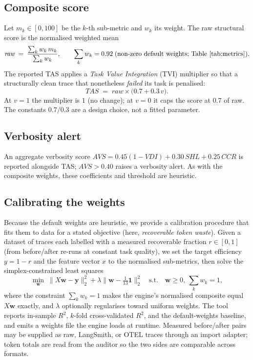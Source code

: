 \documentclass[11pt]{article}
\begin{document}
\subsection{Composite score}
Let $m_k\in[0,100]$ be the $k$-th sub-metric and $w_k$ its weight. The raw
structural score is the normalised weighted mean
\begin{equation}
\textit{raw} \;=\; \frac{\sum_k w_k\, m_k}{\sum_k w_k},
\qquad \sum_k w_k = 0.92
\;\text{(non-zero default weights; Table~\ref{tab:metrics})} .
\end{equation}
The reported TAS applies a \emph{Task Value Integration} (TVI) multiplier so that
a structurally clean trace that nonetheless \emph{failed} its task is penalised:
\begin{equation}
\textit{TAS} \;=\; \textit{raw}\times\bigl(0.7 + 0.3\,v\bigr).
\label{eq:tvi}
\end{equation}
At $v=1$ the multiplier is $1$ (no change); at $v=0$ it caps the score at $0.7$
of raw. The constants $0.7/0.3$ are a design choice, not a fitted parameter.

\subsection{Verbosity alert}
An aggregate verbosity score
$\textit{AVS} = 0.45(1-\textit{VDI}) + 0.30\,\textit{SHL} + 0.25\,\textit{CCR}$
is reported alongside TAS; $\textit{AVS} > 0.40$ raises a verbosity alert. As
with the composite weights, these coefficients and threshold are heuristic.

\subsection{Calibrating the weights}
\label{sec:calib}
Because the default weights are heuristic, we provide a calibration procedure
that fits them to data for a stated objective (here, \emph{recoverable token
waste}). Given a dataset of traces each labelled with a measured recoverable
fraction $r\in[0,1]$ (from before/after re-runs at constant task quality), we set
the target efficiency $y = 1-r$ and the feature vector $x$ to the
normalised sub-metrics, then solve the simplex-constrained least squares
\begin{equation}
\min_{\mathbf{w}}\; \lVert X\mathbf{w} - \mathbf{y}\rVert_2^2 + \lambda\lVert \mathbf{w}-\tfrac{1}{13}\mathbf{1}\rVert_2^2
\quad\text{s.t.}\quad \mathbf{w}\ge 0,\ \textstyle\sum_k w_k = 1 ,
\end{equation}
where the constraint $\sum_k w_k = 1$ makes the engine's normalised composite
equal $X\mathbf{w}$ exactly, and $\lambda$ optionally regularises toward uniform
weights. The tool reports in-sample $R^2$, $k$-fold cross-validated $R^2$, and
the default-weights baseline, and emits a weights file the engine loads at
runtime. Measured before/after pairs may be supplied as raw, LangSmith, or OTEL
traces through an import adapter; token totals are read from the auditor so the
two sides are comparable across formats.
\end{document}
